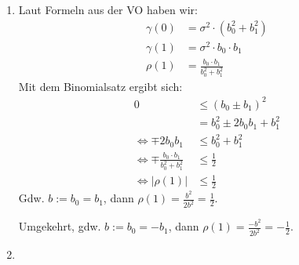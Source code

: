 \documentclass[a4paper,11pt,notitlepage,fullpage]{article}
\begin{document}
\begin{enumerate}
\item Laut Formeln aus der VO haben wir:
\begin{align*}
\gamma(0) &= \sigma^2 \cdot (b_0^2 + b_1^2) \\
\gamma(1) &= \sigma^2 \cdot b_0 \cdot b_1 \\
\rho(1) &= \frac{b_0 \cdot b_1}{b_0^2 + b_1^2}
\end{align*}
Mit dem Binomialsatz ergibt sich:
\begin{align*}
0 &\leq (b_0 \pm b_1)^2 \\
&= b_0^2 \pm 2b_0b_1 + b_1^2 \\
\Leftrightarrow \mp 2b_0b_1 &\leq b_0^2 + b_1^2 \\
\Leftrightarrow \mp \frac{b_0 \cdot b_1}{b_0^2 + b_1^2} &\leq \frac{1}{2} \\
\Leftrightarrow |\rho(1)| &\leq \frac{1}{2}
\end{align*}
Gdw. $b := b_0 = b_1$, dann $\rho(1) = \frac{b^2}{2b^2} = \frac{1}{2}$.

Umgekehrt, gdw. $b := b_0 = -b_1$, dann $\rho(1) = \frac{-b^2}{2b^2} = -\frac{1}{2}$.

\item

\end{enumerate}
\end{document}
